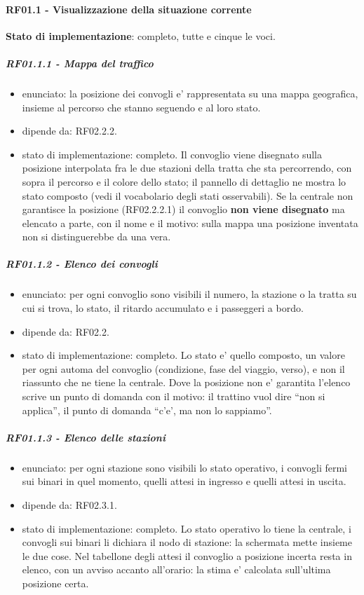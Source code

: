 \documentclass[11pt]{article}
\begin{document}
\paragraph{RF01.1 - Visualizzazione della situazione corrente}
\label{sec:org05f2746}

\textbf{Stato di implementazione}: completo, tutte e cinque le voci.
\subparagraph{RF01.1.1 - Mappa del traffico}
\label{sec:orgd802bb6}
\begin{itemize}
\item enunciato: la posizione dei convogli e' rappresentata su una mappa geografica, insieme al percorso
che stanno seguendo e al loro stato.
\item dipende da: RF02.2.2.
\item stato di implementazione: completo. Il convoglio viene disegnato sulla posizione interpolata fra
le due stazioni della tratta che sta percorrendo, con sopra il percorso e il colore dello stato;
il pannello di dettaglio ne mostra lo stato composto (vedi il vocabolario degli stati osservabili).
Se la centrale non garantisce la posizione (RF02.2.2.1) il convoglio \textbf{non viene disegnato} ma
elencato a parte, con il nome e il motivo: sulla mappa una posizione inventata non si
distinguerebbe da una vera.
\end{itemize}
\subparagraph{RF01.1.2 - Elenco dei convogli}
\label{sec:orgdb22770}
\begin{itemize}
\item enunciato: per ogni convoglio sono visibili il numero, la stazione o la tratta su cui si trova, lo
stato, il ritardo accumulato e i passeggeri a bordo.
\item dipende da: RF02.2.
\item stato di implementazione: completo. Lo stato e' quello composto, un valore per ogni automa del
convoglio (condizione, fase del viaggio, verso), e non il riassunto che ne tiene la centrale. Dove
la posizione non e' garantita l'elenco scrive un punto di domanda con il motivo: il trattino vuol
dire ``non si applica'', il punto di domanda ``c'e', ma non lo sappiamo''.
\end{itemize}
\subparagraph{RF01.1.3 - Elenco delle stazioni}
\label{sec:orga059bb0}
\begin{itemize}
\item enunciato: per ogni stazione sono visibili lo stato operativo, i convogli fermi sui binari in quel
momento, quelli attesi in ingresso e quelli attesi in uscita.
\item dipende da: RF02.3.1.
\item stato di implementazione: completo. Lo stato operativo lo tiene la centrale, i convogli sui binari
li dichiara il nodo di stazione: la schermata mette insieme le due cose. Nel tabellone degli attesi
il convoglio a posizione incerta resta in elenco, con un avviso accanto all'orario: la stima e'
calcolata sull'ultima posizione certa.
\end{itemize}
\end{document}
